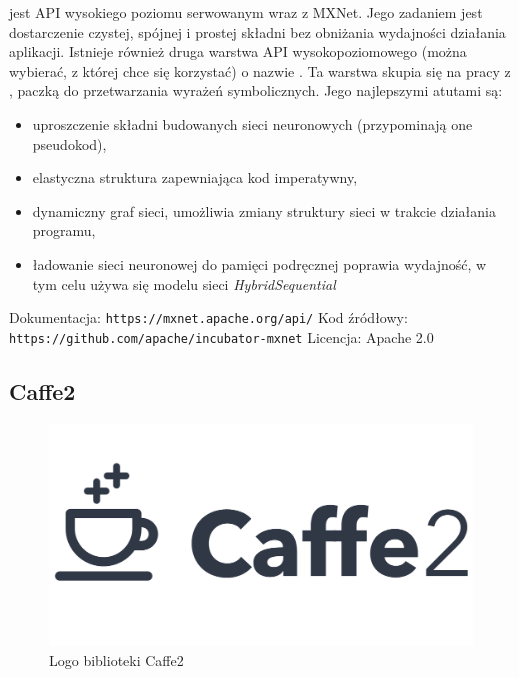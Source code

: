 \documentclass[12pt,a4paper,twoside,titlepage,openright]{book}
\begin{document}
 jest API wysokiego poziomu serwowanym wraz z MXNet. Jego zadaniem jest dostarczenie czystej, spójnej i prostej składni bez obniżania wydajności działania aplikacji. Istnieje również druga warstwa API wysokopoziomowego (można wybierać, z której chce się korzystać) o nazwie . Ta warstwa skupia się na pracy z , paczką do przetwarzania wyrażeń symbolicznych. \cite{DBLP:journals/corr/ChenLLLWWXXZZ15} Jego najlepszymi atutami są:
\begin{itemize}
\item uproszczenie składni budowanych sieci neuronowych (przypominają one pseudokod),
\item elastyczna struktura zapewniająca kod imperatywny,
\item dynamiczny graf sieci, umożliwia zmiany struktury sieci w trakcie działania programu,
\item ładowanie sieci neuronowej do pamięci podręcznej poprawia wydajność, w tym celu używa się modelu sieci \textit{HybridSequential}
\end{itemize}

\noindent 
\newline
Dokumentacja: \texttt{https://mxnet.apache.org/api/}
\newline
Kod źródłowy: \texttt{https://github.com/apache/incubator-mxnet}
\newline
Licencja: Apache 2.0

\subsection{Caffe2}
\begin{figure}[h]
	\centering
			\includegraphics[resolution=100, scale=0.35]{Caffe2.png}
		\caption{Logo biblioteki Caffe2}
\end{figure}
\end{document}
